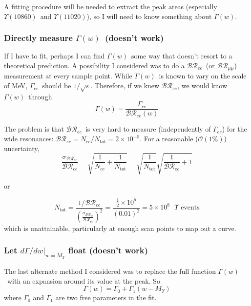 \documentclass[12pt]{article}
\def\yvs{$\Upsilon(10860)$}
\def\yvis{$\Upsilon(11020)$}
\def\gamee{$\Gamma_{ee}$}
\def\gamofw{$\Gamma(w)$}
\def\bree{$\mathcal{BR}_{ee}$}
\def\brmumu{$\mathcal{BR}_{\mu\mu}$}
\begin{document}
A fitting procedure will be needed to extract the peak areas
(especially \yvs\ and \yvis), so I will need to know something about
\gamofw.

\subsubsection{Directly measure \gamofw\ (doesn't work)}

If I have to fit, perhaps I can find \gamofw\ some way that doesn't
resort to a theoretical prediction. A possibility I considered was to
do a \bree\ (or \brmumu) measurement at every sample point. While
\gamofw\ is known to vary on the scale of MeV, \gamee\ should be
$1/\sqrt{s}$. Therefore, if we knew \bree, we would know \gamofw\ 
through
\begin{equation}
  \Gamma(w) = \frac{\Gamma_{ee}}{\mathcal{BR}_{ee}(w)}
\end{equation}

The problem is that \bree\ is very hard to measure (independently of
\gamee) for the wide resonances: $\mathcal{BR}_{ee} =
N_{ee}/N_{\mbox{tot}} = 2\times10^{-5}$. For a reasonable
($\mathcal{O}(1\%)$) uncertainty,
\begin{equation}
  \frac{\sigma_{\mathcal{BR}_{ee}}}{\mathcal{BR}_{ee}} =
  \sqrt{\frac{1}{N_{ee}} + \frac{1}{N_{\mbox{tot}}}} =
  \sqrt{\frac{1}{N_{\mbox{tot}}}} \sqrt{\frac{1}{\mathcal{BR}_{ee}} + 1}
\end{equation}
\begin{center} or \end{center}
\begin{equation}
  N_{\mbox{tot}} =
  \frac{1/\mathcal{BR}_{ee}}{\left(\frac{\sigma_{\mathcal{BR}_{ee}}}{\mathcal{BR}_{ee}}\right)^2} =
  \frac{\frac{1}{2}\times 10^5}{\left(0.01\right)^2} =
  5\times 10^8 \mbox{ } \Upsilon \mbox{ events}
\end{equation}
which is unattainable, particularly at enough scan points to map out a
curve.

\subsubsection{Let $d\Gamma/dw\big|_{w=\mbox{$M_\Upsilon$}}$ float (doesn't work)}
\label{sec:float_slope}

The last alternate method I considered was to replace the full
function \gamofw\ with an expansion around its value at the peak. So
\begin{equation}
  \Gamma(w) = \Gamma_0 + \Gamma_1 (w - \mbox{$M_\Upsilon$})
\end{equation}
where $\Gamma_0$ and $\Gamma_1$ are two free parameters in the fit.
\end{document}
